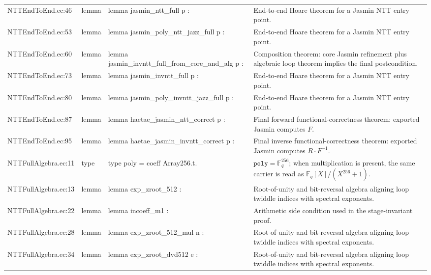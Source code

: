 \documentclass[10pt]{article}
\begin{document}
\begin{longtable}{L{0.11\textwidth}L{0.05\textwidth}L{0.38\textwidth}L{0.42\textwidth}}
NTTEndToEnd.\allowbreak{}ec:\allowbreak{}46 & lemma & {\ttfamily\scriptsize lemma jasmin\_ntt\_full p :} & End-to-end Hoare theorem for a Jasmin NTT entry point. \\
NTTEndToEnd.\allowbreak{}ec:\allowbreak{}53 & lemma & {\ttfamily\scriptsize lemma jasmin\_poly\_ntt\_jazz\_full p :} & End-to-end Hoare theorem for a Jasmin NTT entry point. \\
NTTEndToEnd.\allowbreak{}ec:\allowbreak{}60 & lemma & {\ttfamily\scriptsize lemma jasmin\_invntt\_full\_from\_core\_and\_alg p :} & Composition theorem: core Jasmin refinement plus algebraic loop theorem implies the final postcondition. \\
NTTEndToEnd.\allowbreak{}ec:\allowbreak{}73 & lemma & {\ttfamily\scriptsize lemma jasmin\_invntt\_full p :} & End-to-end Hoare theorem for a Jasmin NTT entry point. \\
NTTEndToEnd.\allowbreak{}ec:\allowbreak{}80 & lemma & {\ttfamily\scriptsize lemma jasmin\_poly\_invntt\_jazz\_full p :} & End-to-end Hoare theorem for a Jasmin NTT entry point. \\
NTTEndToEnd.\allowbreak{}ec:\allowbreak{}87 & lemma & {\ttfamily\scriptsize lemma haetae\_jasmin\_ntt\_correct p :} & Final forward functional-correctness theorem: exported Jasmin computes $F$. \\
NTTEndToEnd.\allowbreak{}ec:\allowbreak{}95 & lemma & {\ttfamily\scriptsize lemma haetae\_jasmin\_invntt\_correct p :} & Final inverse functional-correctness theorem: exported Jasmin computes $R\cdot F^{-1}$. \\
NTTFullAlgebra.\allowbreak{}ec:\allowbreak{}11 & type & {\ttfamily\scriptsize type poly = coeff Array256.t.} & $\mathtt{poly}=\mathbb F_q^{256}$; when multiplication is present, the same carrier is read as $\mathbb F_q[X]/(X^{256}+1)$. \\
NTTFullAlgebra.\allowbreak{}ec:\allowbreak{}13 & lemma & {\ttfamily\scriptsize lemma exp\_zroot\_512 :} & Root-of-unity and bit-reversal algebra aligning loop twiddle indices with spectral exponents. \\
NTTFullAlgebra.\allowbreak{}ec:\allowbreak{}22 & lemma & {\ttfamily\scriptsize lemma incoeff\_m1 :} & Arithmetic side condition used in the stage-invariant proof. \\
NTTFullAlgebra.\allowbreak{}ec:\allowbreak{}28 & lemma & {\ttfamily\scriptsize lemma exp\_zroot\_512\_mul n :} & Root-of-unity and bit-reversal algebra aligning loop twiddle indices with spectral exponents. \\
NTTFullAlgebra.\allowbreak{}ec:\allowbreak{}34 & lemma & {\ttfamily\scriptsize lemma exp\_zroot\_dvd512 e :} & Root-of-unity and bit-reversal algebra aligning loop twiddle indices with spectral exponents. \\

\end{longtable}
\end{document}
